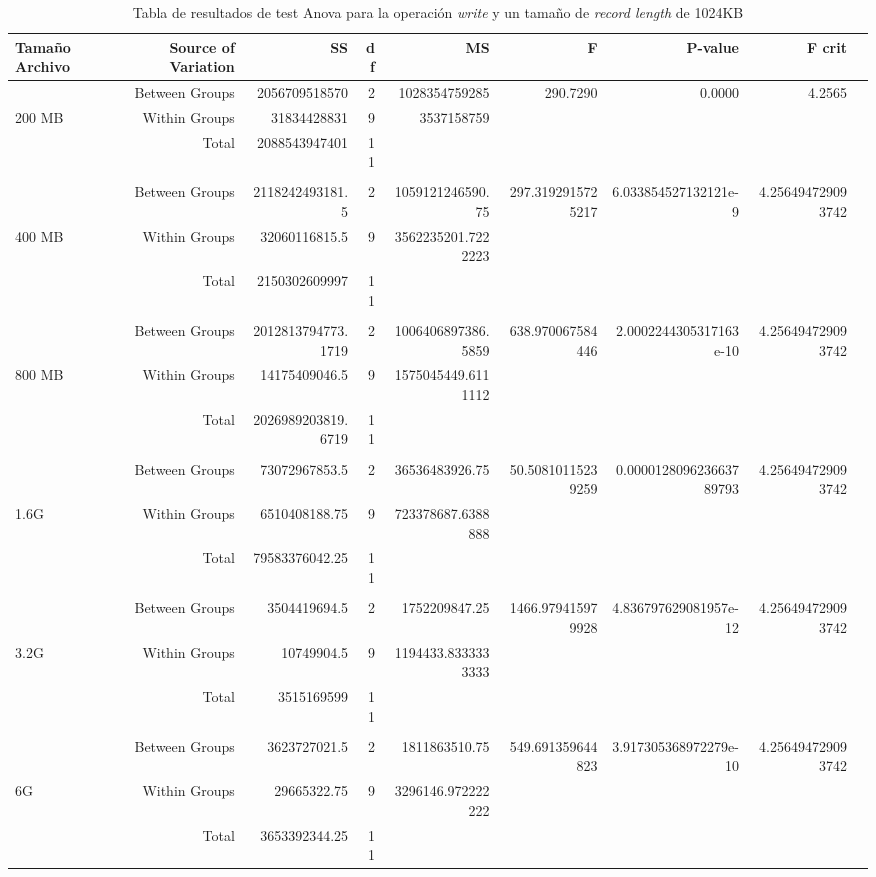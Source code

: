 \begin{landscape}
\begin{table}[!htp]\centering
\caption{Tabla de resultados de test Anova para la operación \textit{write} y un tamaño de \textit{record length} de 1024KB}\label{tab: }
\scriptsize
\begin{tabular}{lrrrrrrrr}\toprule
Tamaño Archivo &Source of Variation &SS &df &MS &F &P-value &F crit \\\midrule
&Between Groups &2056709518570 &2 &1028354759285 &290.7290 &0.0000 &4.2565 \\
200 MB &Within Groups &31834428831 &9 &3537158759 & & & \\
&Total &2088543947401 &11 & & & & \\
& & & & & & & \\
&Between Groups &2118242493181.5 &2 &1059121246590.75 &297.3192915725217 &6.033854527132121e-9 &4.256494729093742 \\
400 MB &Within Groups &32060116815.5 &9 &3562235201.7222223 & & & \\
&Total &2150302609997 &11 & & & & \\
& & & & & & & \\
&Between Groups &2012813794773.1719 &2 &1006406897386.5859 &638.970067584446 &2.0002244305317163e-10 &4.256494729093742 \\
800 MB &Within Groups &14175409046.5 &9 &1575045449.6111112 & & & \\
&Total &2026989203819.6719 &11 & & & & \\
& & & & & & & \\
&Between Groups &73072967853.5 &2 &36536483926.75 &50.50810115239259 &0.000012809623663789793 &4.256494729093742 \\
1.6G &Within Groups &6510408188.75 &9 &723378687.6388888 & & & \\
&Total &79583376042.25 &11 & & & & \\
& & & & & & & \\
&Between Groups &3504419694.5 &2 &1752209847.25 &1466.979415979928 &4.836797629081957e-12 &4.256494729093742 \\
3.2G &Within Groups &10749904.5 &9 &1194433.8333333333 & & & \\
&Total &3515169599 &11 & & & & \\
& & & & & & & \\
&Between Groups &3623727021.5 &2 &1811863510.75 &549.691359644823 &3.917305368972279e-10 &4.256494729093742 \\
6G &Within Groups &29665322.75 &9 &3296146.972222222 & & & \\
&Total &3653392344.25 &11 & & & & \\
\bottomrule
\end{tabular}
\end{table}
\end{landscape}


